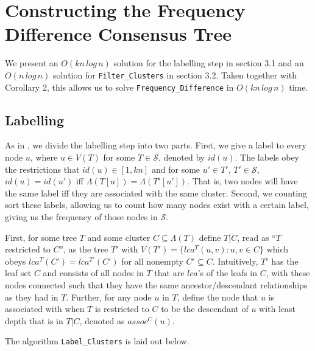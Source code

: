 \documentclass{article}
\newcommand{\leafset}{\Lambda}
\begin{document}
    \section{Constructing the Frequency Difference Consensus Tree}
    \label{sec:freqdiffconstruction}

    We present an $O(kn\,log\,n)$ solution for the labelling step in section 3.1 and an $O(n\,log\,n)$ solution for \texttt{Filter\_Clusters} in section 3.2. Taken together with Corollary 2, this allows us to solve \texttt{Frequency\_Difference} in $O(kn\,log\,n)$ time.

    \subsection{Labelling}
    As in \cite{gawrychowski2017faster}, we divide the labelling step into two parts. First, we give a label to every node $u$, where $u \in V(T)$ for some $T \in \mathcal{S}$, denoted by $id(u)$. The labels obey the restrictions that $id(u) \in [1, kn]$ and for some $u' \in T'$, $T' \in \mathcal{S}$, $id(u) = id(u')$ iff $\leafset(T[u]) = \leafset(T'[u'])$. That is, two nodes will have the same label iff they are associated with the same cluster. Second, we counting sort these labels, allowing us to count how many nodes exist with a certain label, giving us the frequency of those nodes in $\mathcal{S}$.

    First, for some tree $T$ and some cluster $C \subseteq \leafset(T)$ define $T|C$, read as ``$T$ restricted to $C$'', as the tree $T'$ with $V(T') = \{lca^T(u, v) : u, v \in C\}$ which obeys $lca^T(C') = lca^{T'}(C')$ for all nonempty $C' \subseteq C$. Intuitively, $T'$ has the leaf set $C$ and consists of all nodes in $T$ that are $lca$'s of the leafs in $C$, with these nodes connected such that they have the same ancestor/descendant relationships as they had in $T$. Further, for any node $u$ in $T$, define the node that $u$ is associated with when $T$ is restricted to $C$ to be the descendant of $u$ with least depth that is in $T|C$, denoted as $assoc^{C}(u)$.

    The algorithm \texttt{Label\_Clusters} is laid out below.
\end{document}
